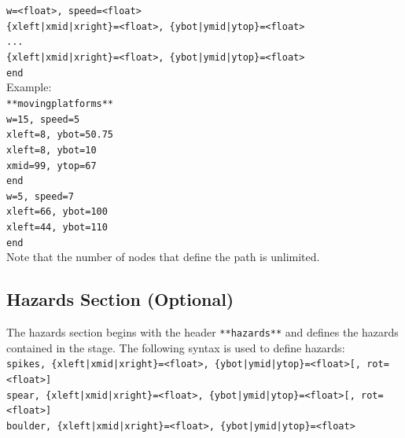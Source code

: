 \documentclass[12pt, titlepage]{article}
\begin{document}
\noindent ${}$\qquad \texttt{w=<float>, speed=<float>}\\
${}$\qquad${}$\qquad \texttt{\{xleft|xmid|xright\}=<float>, \{ybot|ymid|ytop\}=<float>}\\
${}$\qquad${}$\qquad \texttt{...}\\
${}$\qquad${}$\qquad \texttt{\{xleft|xmid|xright\}=<float>, \{ybot|ymid|ytop\}=<float>}\\
${}$\qquad${}$\qquad \texttt{end}\\

\noindent Example:\\

\noindent ${}$\qquad \texttt{**movingplatforms**}\\
${}$\qquad \texttt{w=15, speed=5}\\
${}$\qquad${}$\qquad \texttt{xleft=8, ybot=50.75}\\
${}$\qquad${}$\qquad \texttt{xleft=8, ybot=10}\\
${}$\qquad${}$\qquad \texttt{xmid=99, ytop=67}\\
${}$\qquad${}$\qquad \texttt{end}\\
${}$\qquad \texttt{w=5, speed=7}\\
${}$\qquad${}$\qquad \texttt{xleft=66, ybot=100}\\
${}$\qquad${}$\qquad \texttt{xleft=44, ybot=110}\\
${}$\qquad${}$\qquad \texttt{end}\\

\noindent Note that the number of nodes that define the path is unlimited.

\subsection{Hazards Section (Optional)}
The hazards section begins with the header \texttt{**hazards**} and defines the hazards contained in the stage.  The following syntax is used to define hazards:\\

\noindent ${}$\qquad \texttt{spikes, \{xleft|xmid|xright\}=<float>, \{ybot|ymid|ytop\}=<float>[, rot=<float>]}\\
${}$\qquad \texttt{spear, \{xleft|xmid|xright\}=<float>, \{ybot|ymid|ytop\}=<float>[, rot=<float>]}\\
${}$\qquad \texttt{boulder, \{xleft|xmid|xright\}=<float>, \{ybot|ymid|ytop\}=<float>}\\\\
\end{document}
